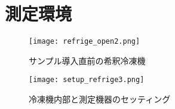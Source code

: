 \section{測定環境}
\begin{figure}[H]
    \begin{center}
        \texttt{[image: refrige\_open2.png]}
        \caption{サンプル導入直前の希釈冷凍機}
    \end{center}
\end{figure}

\begin{figure}[H]   
    \begin{center}
        \texttt{[image: setup\_refrige3.png]}
        \caption{冷凍機内部と測定機器のセッティング}
    \end{center}
\end{figure}
